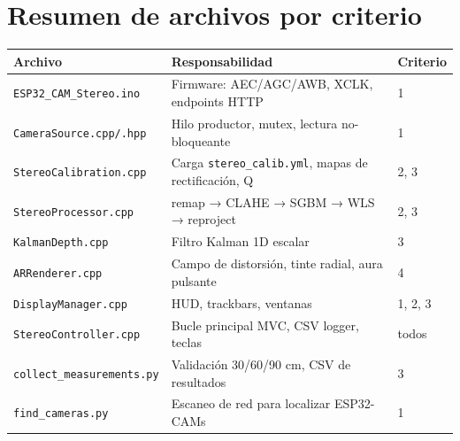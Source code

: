 \documentclass[11pt,a4paper]{article}
\begin{document}
\section*{Resumen de archivos por criterio}

\begin{center}
\begin{tabular}{p{4cm}p{5.5cm}p{5cm}}
\toprule
\textbf{Archivo} & \textbf{Responsabilidad} & \textbf{Criterio} \\
\midrule
\texttt{ESP32\_CAM\_Stereo.ino} & Firmware: AEC/AGC/AWB, XCLK, endpoints HTTP & 1 \\
\texttt{CameraSource.cpp/.hpp} & Hilo productor, mutex, lectura no-bloqueante & 1 \\
\texttt{StereoCalibration.cpp} & Carga \texttt{stereo\_calib.yml}, mapas de rectificación, Q & 2, 3 \\
\texttt{StereoProcessor.cpp} & remap → CLAHE → SGBM → WLS → reproject & 2, 3 \\
\texttt{KalmanDepth.cpp} & Filtro Kalman 1D escalar & 3 \\
\texttt{ARRenderer.cpp} & Campo de distorsión, tinte radial, aura pulsante & 4 \\
\texttt{DisplayManager.cpp} & HUD, trackbars, ventanas & 1, 2, 3 \\
\texttt{StereoController.cpp} & Bucle principal MVC, CSV logger, teclas & todos \\
\texttt{collect\_measurements.py} & Validación 30/60/90 cm, CSV de resultados & 3 \\
\texttt{find\_cameras.py} & Escaneo de red para localizar ESP32-CAMs & 1 \\
\bottomrule
\end{tabular}
\end{center}
\end{document}
